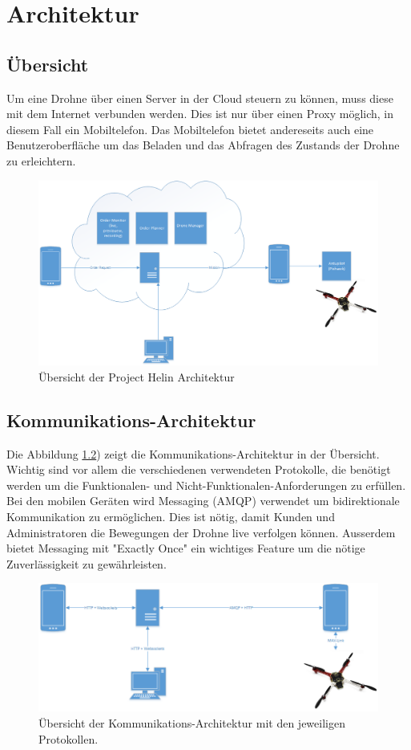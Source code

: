 \chapter{Architektur}

\section{Übersicht}

Um eine Drohne über einen Server in der Cloud steuern zu können, muss diese mit dem Internet verbunden werden. Dies ist nur über einen Proxy möglich, in diesem Fall ein Mobiltelefon. Das Mobiltelefon bietet andereseits auch eine Benutzeroberfläche um das Beladen und das Abfragen des Zustands der Drohne zu erleichtern. \\

\begin{figure}[h]
	\includegraphics[width=1.0\textwidth]{images/Overview-Diagram.png}
	\caption{Übersicht der Project Helin Architektur }
	\label{fig:architecture-overview}
\end{figure}

\section{Kommunikations-Architektur}

Die Abbildung \ref{fig:communication-architecture-overview}) zeigt die Kommunikations-Architektur in der Übersicht. Wichtig sind vor allem die verschiedenen verwendeten Protokolle, die benötigt werden um die Funktionalen- und Nicht-Funktionalen-Anforderungen zu erfüllen. Bei den mobilen Geräten wird Messaging (AMQP) verwendet um bidirektionale Kommunikation zu ermöglichen. Dies ist nötig, damit Kunden und Administratoren die Bewegungen der Drohne live verfolgen können. Ausserdem bietet Messaging mit "Exactly Once" ein wichtiges Feature um die nötige Zuverlässigkeit zu gewährleisten. 


\begin{figure}[h]
	\includegraphics[width=1.0\textwidth]{images/Communication-Overview-Diagram.png}
	\caption{Übersicht der Kommunikations-Architektur mit den jeweiligen Protokollen. }
	\label{fig:communication-architecture-overview}
\end{figure}